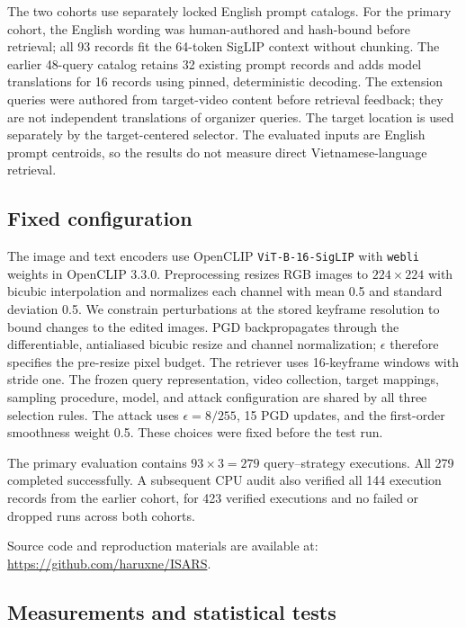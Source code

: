 \documentclass[runningheads]{llncs}
\begin{document}
The two cohorts use separately locked English prompt catalogs. For the primary cohort, the English wording was human-authored and hash-bound before retrieval; all 93 records fit the 64-token SigLIP context without chunking. The earlier 48-query catalog retains 32 existing prompt records and adds model translations for 16 records using pinned, deterministic decoding. The extension queries were authored from target-video content before retrieval feedback; they are not independent translations of organizer queries. The target location is used separately by the target-centered selector. The evaluated inputs are English prompt centroids, so the results do not measure direct Vietnamese-language retrieval.

\subsection{Fixed configuration}

The image and text encoders use OpenCLIP \texttt{ViT-B-16-SigLIP} with \texttt{webli} weights in OpenCLIP 3.3.0. Preprocessing resizes RGB images to $224\times224$ with bicubic interpolation and normalizes each channel with mean 0.5 and standard deviation 0.5. We constrain perturbations at the stored keyframe resolution to bound changes to the edited images. PGD backpropagates through the differentiable, antialiased bicubic resize and channel normalization; $\epsilon$ therefore specifies the pre-resize pixel budget. The retriever uses 16-keyframe windows with stride one. The frozen query representation, video collection, target mappings, sampling procedure, model, and attack configuration are shared by all three selection rules. The attack uses $\epsilon=8/255$, 15 PGD updates, and the first-order smoothness weight 0.5. These choices were fixed before the test run.

The primary evaluation contains $93\times3=279$ query--strategy executions. All 279 completed successfully. A subsequent CPU audit also verified all 144 execution records from the earlier cohort, for 423 verified executions and no failed or dropped runs across both cohorts.

Source code and reproduction materials are available at: \url{https://github.com/haruxne/ISARS}.

\subsection{Measurements and statistical tests}
\end{document}
